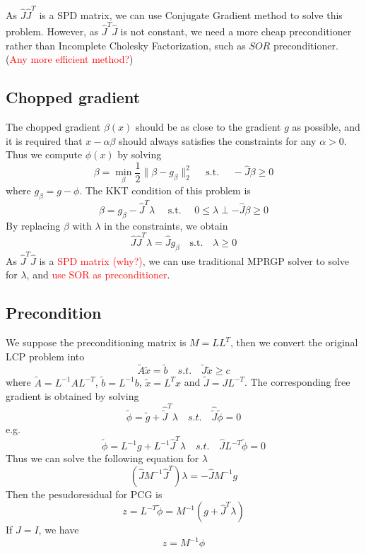 \documentclass[9pt,twocolumn]{extarticle}
\newcommand{\TODO}[1]{\textcolor{red}{#1}}
\begin{document}
As $\hat{J}\hat{J}^T$ is a SPD matrix, we can use Conjugate Gradient method to solve this problem. However, as $\hat{J}^T\hat{J}$ is not constant, we need a more cheap preconditioner rather than Incomplete Cholesky Factorization, such as $SOR$ preconditioner. (\TODO{Any more efficient method?})

\subsection{Chopped gradient}
The chopped gradient $\beta(x)$ should be as close to the gradient $g$ as possible, and it is required that $x-\alpha \beta$ should always satisfies the constraints for any $\alpha > 0$. Thus we compute $\phi(x)$ by solving
\begin{equation}
  \beta = \min_\beta \frac{1}{2} \|\beta - g_\beta\|_2^2  \quad \mbox{ s.t. } \quad -\hat{J} \beta \ge 0
\end{equation}
where $g_\beta = g-\phi$. The KKT condition of this problem is
\begin{equation}
  \beta = g_\beta - \hat{J}^T\lambda  \quad \mbox{ s.t. } \quad 0 \le \lambda \perp -\hat{J} \beta \ge 0
\end{equation}
By replacing $\beta$ with $\lambda$ in the constraints, we obtain
\begin{equation}
  \hat{J}\hat{J}^T\lambda = \hat{J}g_\beta \quad \mbox{s.t.} \quad \lambda \ge 0
\end{equation}
As $\hat{J}^T\hat{J}$ is a \TODO{SPD matrix (why?)}, we can use traditional MPRGP solver to solve for $\lambda$, and \TODO{use SOR as preconditioner}.

\subsection{Precondition}
We suppose the preconditioning matrix is $M = LL^T$, then we convert the original LCP problem into
\begin{equation}
  \tilde{A} \tilde{x} = \tilde{b} \quad {s.t.} \quad \tilde{J}\tilde{x} \ge c
\end{equation}
where $\tilde{A} = L^{-1}AL^{-T}$, $\tilde{b} = L^{-1}b$, $\tilde{x} = L^{T}x$ and $\tilde{J} = JL^{-T}$. The corresponding free gradient is obtained by solving
\begin{equation}
  \tilde{\phi} = \tilde{g} + \hat{\tilde{J}}^T\lambda \quad {s.t.} \quad \hat{\tilde{J}}\tilde{\phi} = 0
\end{equation}
e.g.
\begin{equation}
  \tilde{\phi} = L^{-1}g + L^{-1}\hat{J}^T\lambda \quad {s.t.} \quad \hat{J}L^{-T}\tilde{\phi} = 0
\end{equation}
Thus we can solve the following equation for $\lambda$
\begin{equation}
  (\hat{J}M^{-1}\hat{J}^T)\lambda = -\hat{J}M^{-1}g
\end{equation}
Then the pesudoresidual for PCG is 
\begin{equation}
  z = L^{-T}\tilde{\phi} = M^{-1}(g + \hat{J}^T\lambda)
\end{equation}
If $J = I$, we have 
\begin{equation}
  z = M^{-1} \phi
\end{equation}

\end{document}
